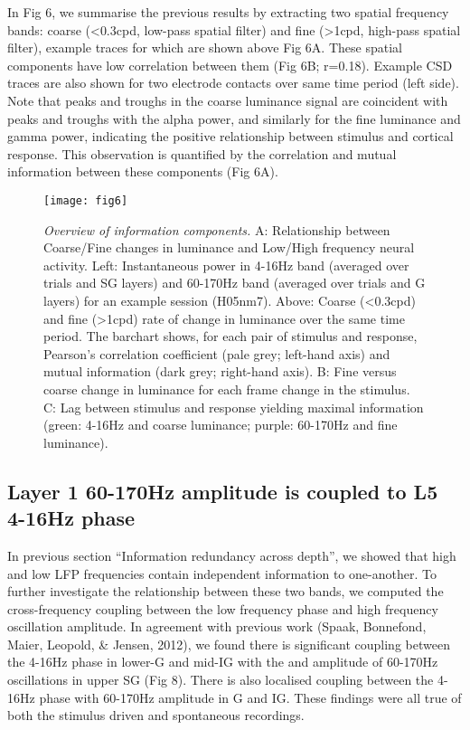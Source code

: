 In Fig 6, we summarise the previous results by extracting two spatial frequency bands: coarse ({\textless}0.3cpd, low-pass spatial filter) and fine ({\textgreater}1cpd, high-pass spatial filter), example traces for which are shown above Fig 6A. These spatial components have low correlation between them (Fig 6B; r=0.18). Example \ac{CSD} traces are also shown for two electrode contacts over same time period (left side). Note that peaks and troughs in the coarse luminance signal are coincident with peaks and troughs with the alpha power, and similarly for the fine luminance and gamma power, indicating the positive relationship between stimulus and cortical response. This observation is quantified by the correlation and mutual information between these components (Fig 6A).

\begin{figure}[htbp]
\centering \texttt{[image: fig6]}
%
\caption{%
\textit{Overview of information components.}
A: Relationship between Coarse/Fine changes in luminance and Low/High frequency neural activity.
Left: Instantaneous power in 4-16Hz band (averaged over trials and \ac{SG} layers) and 60-170Hz band (averaged over trials and \ac{G} layers) for an example session (H05nm7).
Above: Coarse (<0.3cpd) and fine (>1cpd) rate of change in luminance over the same time period.
The barchart shows, for each pair of stimulus and response, Pearson's correlation coefficient (pale grey; left-hand axis) and mutual information (dark grey; right-hand axis).
B: Fine versus coarse change in luminance for each frame change in the stimulus.
C: Lag between stimulus and response yielding maximal information (green: 4-16Hz and coarse luminance; purple: 60-170Hz and fine luminance).}%
\label{fig:lam_6}
%
\end{figure}

\subsection{Layer 1 60-170Hz amplitude is coupled to \ac{L5} 4-16Hz phase}
In previous section ``Information redundancy across depth'', we showed that high and low \ac{LFP} frequencies contain independent information to one-another. To further investigate the relationship between these two bands, we computed the cross-frequency coupling between the low frequency phase and high frequency oscillation amplitude. In agreement with previous work (Spaak, Bonnefond, Maier, Leopold, \& Jensen, 2012), we found there is significant coupling between the 4-16Hz phase in lower-\ac{G} and mid-\ac{IG} with the and amplitude of 60-170Hz oscillations in upper \ac{SG} (Fig 8). There is also localised coupling between the 4-16Hz phase with 60-170Hz amplitude in \ac{G} and \ac{IG}. These findings were all true of both the stimulus driven and spontaneous recordings.

